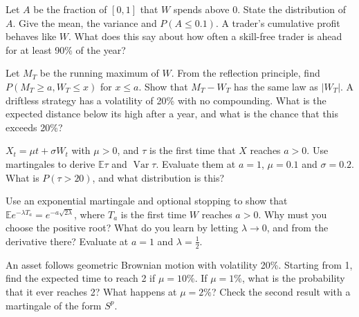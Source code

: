 \begin{question}\label{iq:iv1:stochastic-calculus:22}
Let $A$ be the fraction of $[0, 1]$ that $W$ spends above 0. State the distribution of $A$. Give the mean, the variance and $P(A \le 0.1)$. A trader's cumulative profit behaves like $W$. What does this say about how often a skill-free trader is ahead for at least 90\% of the year?
\end{question}

\begin{question}\label{iq:iv1:stochastic-calculus:23}
Let $M_T$ be the running maximum of $W$. From the reflection principle, find $P(M_T \ge a, W_T \le x)$ for $x \le a$. Show that $M_T - W_T$ has the same law as $|W_T|$. A driftless strategy has a volatility of 20\% with no compounding. What is the expected distance below its high after a year, and what is the chance that this exceeds 20\%?
\end{question}

\begin{question}\label{iq:iv1:stochastic-calculus:24}
$X_t = \mu t + \sigma W_t$ with $\mu > 0$, and $\tau$ is the first time that $X$ reaches $a > 0$. Use martingales to derive $\mathbb{E}\tau$ and $\operatorname{Var}\tau$. Evaluate them at $a = 1$, $\mu = 0.1$ and $\sigma = 0.2$. What is $P(\tau > 20)$, and what distribution is this?
\end{question}

\begin{question}\label{iq:iv1:stochastic-calculus:25}
Use an exponential martingale and optional stopping to show that $\mathbb{E}e^{-\lambda T_a} = e^{-a\sqrt{2\lambda}}$, where $T_a$ is the first time $W$ reaches $a > 0$. Why must you choose the positive root? What do you learn by letting $\lambda \to 0$, and from the derivative there? Evaluate at $a = 1$ and $\lambda = \frac12$.
\end{question}

\begin{question}\label{iq:iv1:stochastic-calculus:26}
An asset follows geometric Brownian motion with volatility 20\%. Starting from 1, find the expected time to reach 2 if $\mu = 10\%$. If $\mu = 1\%$, what is the probability that it ever reaches 2? What happens at $\mu = 2\%$? Check the second result with a martingale of the form $S^p$.
\end{question}

